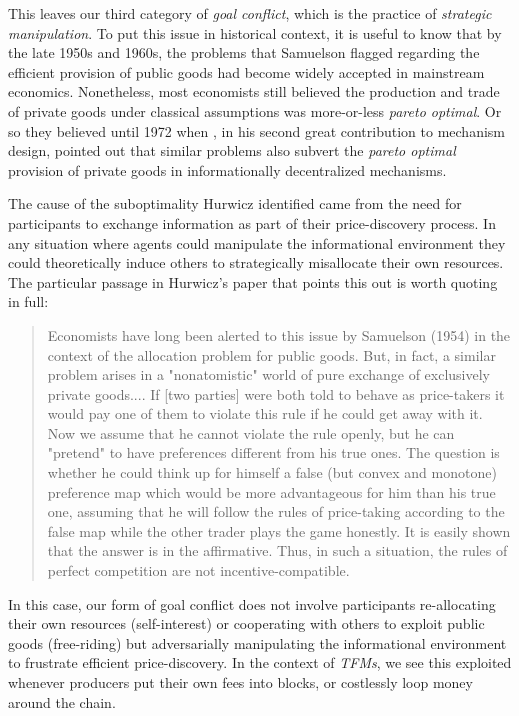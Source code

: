 \documentclass[sigconf,anonymous]{aamas}
\begin{document}
This leaves our third category of \textit{goal conflict}, which is the practice of \textit{strategic manipulation}. To put this issue in historical context, it is useful to know that by the late 1950s and 1960s, the problems that Samuelson flagged regarding the efficient provision of public goods had become widely accepted in mainstream economics. Nonetheless, most economists still believed the production and trade of private goods under classical assumptions was more-or-less \textit{pareto optimal}. Or so they believed until 1972 when \citet{hurwicz1973design}, in his second great contribution to mechanism design, pointed out that similar problems also subvert the \textit{pareto optimal} provision of private goods in informationally decentralized mechanisms. 

The cause of the suboptimality Hurwicz identified came from the need for participants to exchange information as part of their price-discovery process. In any situation where agents could manipulate the informational environment they could theoretically induce others to strategically misallocate their own resources. The particular passage in Hurwicz's paper that points this out is worth quoting in full:

\begin{quote}
Economists have long been alerted to this issue by Samuelson (1954) in the context of the allocation problem for public goods. But, in fact, a similar problem arises in a "nonatomistic" world of pure exchange of exclusively private goods.... If [two parties] were both told to behave as price-takers it would pay one of them to violate this rule if he could get away with it. Now we assume that he cannot violate the rule openly, but he can "pretend" to have preferences different from his true ones. The question is whether he could think up for himself a false (but convex and monotone) preference map which would be more advantageous for him than his true one, assuming that he will follow the rules of price-taking according to the false map while the other trader plays the game honestly. It is easily shown that the answer is in the affirmative. Thus, in such a situation, the rules of perfect competition are not incentive-compatible.
\end{quote}

In this case, our form of goal conflict does not involve participants re-allocating their own resources (self-interest) or cooperating with others to exploit public goods (free-riding) but adversarially manipulating the informational environment to frustrate efficient price-discovery. In the context of \textit{TFMs}, we see this exploited whenever producers put their own fees into blocks, or costlessly loop money around the chain.
\end{document}
